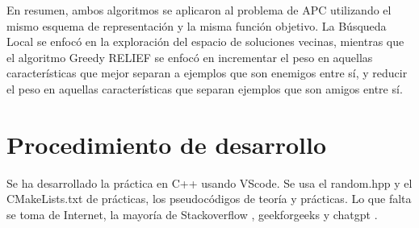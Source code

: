 En resumen, ambos algoritmos se aplicaron al problema de APC utilizando el mismo esquema de representación y la misma función objetivo. La Búsqueda Local se enfocó en la exploración del espacio de soluciones vecinas, mientras que el algoritmo Greedy RELIEF se enfocó en incrementar el peso en aquellas características que mejor separan a ejemplos que son enemigos entre sí, y reducir el peso en aquellas características que separan ejemplos que son amigos entre sí. 

\section{Procedimiento de desarrollo}
Se ha desarrollado la práctica en C++ usando VScode.  Se usa el random.hpp y el CMakeLists.txt de prácticas, los pseudocódigos de teoría y prácticas. Lo que falta se toma de Internet, la mayoría de Stackoverflow \cite{Stackoverflow}, geekforgeeks \cite{greekforgeeks} y chatgpt \cite{chatgpt}. \\

